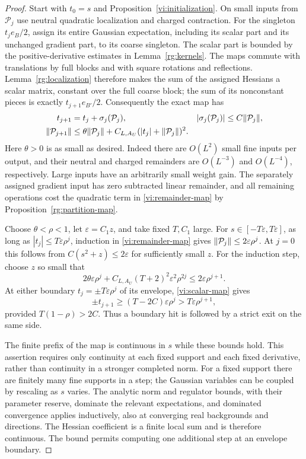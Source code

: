 \begin{proof}
Start with $t_0=s$ and Proposition~\ref{vi:initialization}.  On small
inputs from $\mathcal P_j$ use neutral quadratic localization and charged
contraction.  For the singleton $t_je_B/2$, assign its entire Gaussian
expectation, including its scalar part and its unchanged gradient part,
to its coarse singleton.  The scalar part is bounded by the
positive-derivative estimates in Lemma~\ref{rg:kernels}.  The maps commute
with translations by full blocks and with square rotations and
reflections.  Lemma~\ref{rg:localization} therefore makes the sum of the
assigned Hessians a scalar matrix, constant over the full coarse block;
the sum of its nonconstant pieces is exactly $t_{j+1}e_{B'}/2$.
Consequently the exact map has
\begin{align}
 t_{j+1}&=t_j+\sigma_j(\mathcal P_j),&
 |\sigma_j(\mathcal P_j)|&\le C\lVert \mathcal P_j\rVert,\label{vi:scalar-map}\\
 \lVert \mathcal P_{j+1}\rVert&\le
 \theta\lVert \mathcal P_j\rVert
              +C_{L,A_U}(|t_j|+\lVert \mathcal P_j\rVert)^2 .  \label{vi:remainder-map}
\end{align}
Here $\theta>0$ is as small as desired.  Indeed there are $O(L^2)$ small
fine inputs per output, and their neutral and charged remainders are
$O(L^{-3})$ and $O(L^{-4})$, respectively.  Large inputs have an
arbitrarily small weight gain.  The separately assigned gradient input
has zero subtracted linear remainder, and all remaining operations cost
the quadratic term in \eqref{vi:remainder-map} by
Proposition~\ref{rg:partition-map}.

Choose $\theta<\rho<1$, let $\varepsilon=C_1z$, and take fixed $T,C_1$
large.  For $s\in[-T\varepsilon,T\varepsilon]$, as long as
$|t_j|\le T\varepsilon\rho^j$, induction in
\eqref{vi:remainder-map} gives
$\lVert \mathcal P_j\rVert\le2\varepsilon\rho^j$.  At $j=0$ this follows
from $C(s^2+z)\le2\varepsilon$ for sufficiently small $z$.
For the induction step, choose $z$ so small that
\[
 2\theta\varepsilon\rho^j+
 C_{L,A_U}(T+2)^2\varepsilon^2\rho^{2j}
       \le2\varepsilon\rho^{j+1}.
\]
At either boundary $t_j=\pm T\varepsilon\rho^j$ of its envelope,
\eqref{vi:scalar-map} gives
\[
 \pm t_{j+1}\ge(T-2C)\varepsilon\rho^j
                         >T\varepsilon\rho^{j+1},
\]
provided $T(1-\rho)>2C$.  Thus a boundary hit is followed by a strict
exit on the same side.

The finite prefix of the map is continuous in $s$ while these bounds
hold.  This assertion requires only continuity at each fixed support and
each fixed derivative, rather than continuity in a stronger completed
norm.  For a fixed support there are finitely many fine supports in a
step; the Gaussian variables can be coupled by rescaling as $s$ varies.
The analytic norm and regulator bounds, with their parameter reserve,
dominate the relevant expectations, and dominated convergence applies
inductively, also at converging real backgrounds and directions.  The
Hessian coefficient is a finite local sum and is therefore continuous.
The bound permits computing one additional step at an envelope boundary.


\end{proof}
